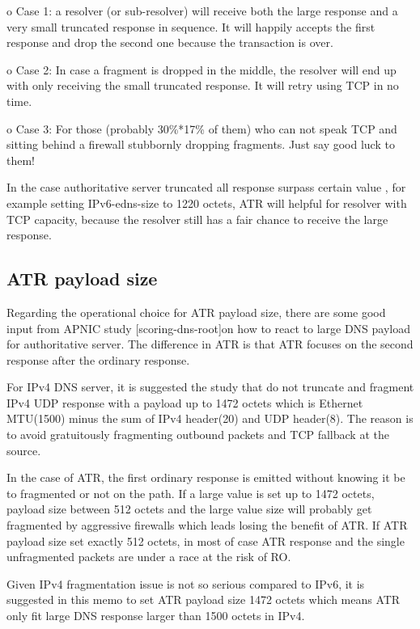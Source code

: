    o  Case 1: a resolver (or sub-resolver) will receive both the large
   response and a very small truncated response in sequence.  It will
   happily accepts the first response and drop the second one because
   the transaction is over.

    o  Case 2: In case a fragment is dropped in the middle, the resolver
   will end up with only receiving the small truncated response.  It
   will retry using TCP in no time.

   o  Case 3: For those (probably 30\%*17\% of them) who can not speak TCP
      and sitting behind a firewall stubbornly dropping fragments.  Just
      say good luck to them!


   In the case authoritative server truncated all response surpass
   certain value , for example setting IPv6-edns-size to 1220 octets,
   ATR will helpful for resolver with TCP capacity, because the resolver
   still has a fair chance to receive the large response.



   \subsection{ATR payload size}
      Regarding the operational choice for ATR payload size, there are some
   good input from APNIC study [scoring-dns-root]on how to react to
   large DNS payload for authoritative server.  The difference in ATR is
   that ATR focuses on the second response after the ordinary response.

   For IPv4 DNS server, it is suggested the study that do not truncate
   and fragment IPv4 UDP response with a payload up to 1472 octets which
   is Ethernet MTU(1500) minus the sum of IPv4 header(20) and UDP
   header(8).  The reason is to avoid gratuitously fragmenting outbound
   packets and TCP fallback at the source.

   In the case of ATR, the first ordinary response is emitted without
   knowing it be to fragmented or not on the path.  If a large value is
   set up to 1472 octets, payload size between 512 octets and the large
   value size will probably get fragmented by aggressive firewalls which
   leads losing the benefit of ATR.  If ATR payload size set exactly 512
   octets, in most of case ATR response and the single unfragmented
   packets are under a race at the risk of RO.

   Given IPv4 fragmentation issue is not so serious compared to IPv6, it
   is suggested in this memo to set ATR payload size 1472 octets which
   means ATR only fit large DNS response larger than 1500 octets in
   IPv4.

